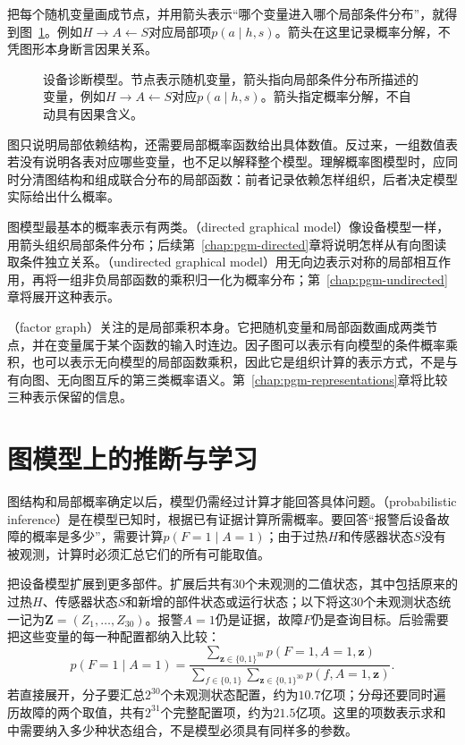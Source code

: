 把每个随机变量画成节点，并用箭头表示“哪个变量进入哪个局部条件分布”，就得到图~\ref{fig:pgm-overview-device-graph}。例如$H\to A\leftarrow S$对应局部项$p(a\mid h,s)$。箭头在这里记录概率分解，不凭图形本身断言因果关系。

\begin{figure}[htbp]
  \centering
  
  \caption{设备诊断模型。节点表示随机变量，箭头指向局部条件分布所描述的变量，例如$H\to A\leftarrow S$对应$p(a\mid h,s)$。箭头指定概率分解，不自动具有因果含义。}
  \label{fig:pgm-overview-device-graph}
\end{figure}

图只说明局部依赖结构，还需要局部概率函数给出具体数值。反过来，一组数值表若没有说明各表对应哪些变量，也不足以解释整个模型。理解概率图模型时，应同时分清图结构和组成联合分布的局部函数：前者记录依赖怎样组织，后者决定模型实际给出什么概率。

图模型最基本的概率表示有两类。（directed graphical model）像设备模型一样，用箭头组织局部条件分布；后续第~\ref{chap:pgm-directed}章将说明怎样从有向图读取条件独立关系。（undirected graphical model）用无向边表示对称的局部相互作用，再将一组非负局部函数的乘积归一化为概率分布；第~\ref{chap:pgm-undirected}章将展开这种表示。

（factor graph）关注的是局部乘积本身。它把随机变量和局部函数画成两类节点，并在变量属于某个函数的输入时连边。因子图可以表示有向模型的条件概率乘积，也可以表示无向模型的局部函数乘积，因此它是组织计算的表示方式，不是与有向图、无向图互斥的第三类概率语义。第~\ref{chap:pgm-representations}章将比较三种表示保留的信息。

\section{图模型上的推断与学习}
\label{sec:pgm-overview-inference-learning}

图结构和局部概率确定以后，模型仍需经过计算才能回答具体问题。（probabilistic inference）是在模型已知时，根据已有证据计算所需概率。要回答“报警后设备故障的概率是多少”，需要计算$p(F=1\mid A=1)$；由于过热$H$和传感器状态$S$没有被观测，计算时必须汇总它们的所有可能取值。

把设备模型扩展到更多部件。扩展后共有$30$个未观测的二值状态，其中包括原来的过热$H$、传感器状态$S$和新增的部件状态或运行状态；以下将这$30$个未观测状态统一记为$\bm{Z}=(Z_1,\ldots,Z_{30})$。报警$A=1$仍是证据，故障$F$仍是查询目标。后验需要把这些变量的每一种配置都纳入比较：
\begin{equation}
  p(F=1\mid A=1)
  =
  \frac{
    \displaystyle\sum_{\bm{z}\in\{0,1\}^{30}}
    p(F=1,A=1,\bm{z})
  }{
    \displaystyle\sum_{f\in\{0,1\}}
    \sum_{\bm{z}\in\{0,1\}^{30}}
    p(f,A=1,\bm{z})
  }.
  \label{eq:pgm-overview-expanded-diagnosis}
\end{equation}
若直接展开，分子要汇总$2^{30}$个未观测状态配置，约为$10.7$亿项；分母还要同时遍历故障的两个取值，共有$2^{31}$个完整配置项，约为$21.5$亿项。这里的项数表示求和中需要纳入多少种状态组合，不是模型必须具有同样多的参数。

